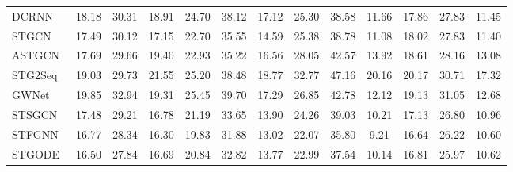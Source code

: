 \documentclass[letterpaper]{article} \usepackage{aaai24}  \usepackage{times}  \usepackage{helvet}  \usepackage{courier}  \usepackage[hyphens]{url}  \usepackage{graphicx} \urlstyle{rm} \def\UrlFont{\rm}  \usepackage{natbib}  \usepackage{caption} \frenchspacing  \setlength{\pdfpagewidth}{8.5in} \setlength{\pdfpageheight}{11in} \usepackage{algorithm}
\begin{document}
\begin{table*}[h]
{\begin{tabular}{l|c c c|c c c |c c c|c c c}
DCRNN~\cite{li2018diffusion}                & 18.18                & 30.31          & 18.91                      & 24.70                 & 38.12            & 17.12                    & 25.30                 &  38.58               & 11.66                & 17.86                &  27.83              & 11.45                 \\
STGCN~\cite{yu2018spatio}                   & 17.49                & 30.12          & 17.15                      & 22.70                 & 35.55            & 14.59                    & 25.38                &  38.78               & 11.08                & 18.02                &  27.83              & 11.40                  \\
ASTGCN~\cite{guo2019attention}           & 17.69                & 29.66          & 19.40                       & 22.93                & 35.22            & 16.56                    & 28.05                &  42.57               & 13.92                & 18.61                &  28.16              & 13.08                 \\
STG2Seq~\cite{bai2019stg2seq}               & 19.03                & 29.73          & 21.55                      & 25.20                 & 38.48            & 18.77                    & 32.77                &  47.16               & 20.16                & 20.17                &  30.71              & 17.32                 \\
GWNet~\cite{wu2019graph}                    & 19.85                & 32.94          & 19.31                      & 25.45                & 39.70             & 17.29                    & 26.85                &  42.78               & 12.12                & 19.13                &  31.05              & 12.68                 \\
STSGCN~\cite{song2020spatial}               & 17.48                & 29.21          & 16.78                      & 21.19                & 33.65            & 13.90                     & 24.26                &  39.03               & 10.21                & 17.13                &  26.80               & 10.96                 \\
STFGNN~\cite{li2021spatial}                 & 16.77                & 28.34          & 16.30                       & 19.83                & 31.88            & 13.02                    & 22.07                &  35.80                & 9.21                 & 16.64                &  26.22              & 10.60                  \\
STGODE~\cite{fang2021spatial}               & 16.50                 & 27.84          & 16.69                      & 20.84                & 32.82            & 13.77                    & 22.99                &  37.54               & 10.14                & 16.81                &  25.97              & 10.62                 \\

\end{tabular}}
\end{table*}
\end{document}
